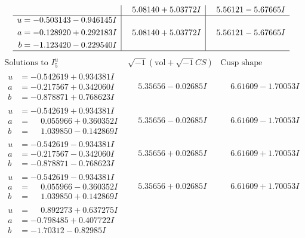 \documentclass[1p]{elsarticle_modified}
\theoremstyle{definition}
\newcommand{\I}{\sqrt{-1}}
\begin{document}
$$\begin{array}{c|c|c}
 & \phantom{-}5.08140 + 5.03772 I & \phantom{-}5.56121 - 5.67665 I \\ \hline\begin{aligned}
u &= -0.503143 - 0.946145 I \\
a &= -0.128920 + 0.292183 I \\
b &= -1.123420 - 0.229540 I\end{aligned}
 & \phantom{-}5.08140 + 5.03772 I & \phantom{-}5.56121 - 5.67665 I\\
 \hline 
 \end{array}$$\newpage$$\begin{array}{c|c|c}  
\text{Solutions to }I^u_{5}& \I (\text{vol} + \sqrt{-1}CS) & \text{Cusp shape}\\
 \hline 
\begin{aligned}
u &= -0.542619 + 0.934381 I \\
a &= -0.217567 + 0.342060 I \\
b &= -0.878871 + 0.768623 I\end{aligned}
 & \phantom{-}5.35656 - 0.02685 I & \phantom{-}6.61609 - 1.70053 I \\ \hline\begin{aligned}
u &= -0.542619 + 0.934381 I \\
a &= \phantom{-}0.055966 + 0.360352 I \\
b &= \phantom{-}1.039850 - 0.142869 I\end{aligned}
 & \phantom{-}5.35656 - 0.02685 I & \phantom{-}6.61609 - 1.70053 I \\ \hline\begin{aligned}
u &= -0.542619 - 0.934381 I \\
a &= -0.217567 - 0.342060 I \\
b &= -0.878871 - 0.768623 I\end{aligned}
 & \phantom{-}5.35656 + 0.02685 I & \phantom{-}6.61609 + 1.70053 I \\ \hline\begin{aligned}
u &= -0.542619 - 0.934381 I \\
a &= \phantom{-}0.055966 - 0.360352 I \\
b &= \phantom{-}1.039850 + 0.142869 I\end{aligned}
 & \phantom{-}5.35656 + 0.02685 I & \phantom{-}6.61609 + 1.70053 I \\ \hline\begin{aligned}
u &= \phantom{-}0.892273 + 0.637275 I \\
a &= -0.798485 + 0.407722 I \\
b &= -1.70312 - 0.82985 I\end{aligned}

\end{array}$$
\end{document}
